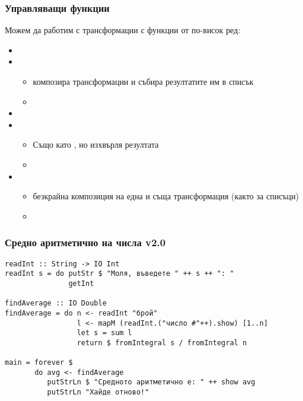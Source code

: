 \documentclass[alsotrans,beameroptions={aspectratio=169}]{beamerswitch}
\begin{document}
\begin{frame}
  \frametitle{Управляващи функции}

  Можем да работим с трансформации с функции от по-висок ред:
  \begin{itemize}[<+->]
  \item {}
  \item {}
    \begin{itemize}
    \item композира трансформации и събира резултатите им в списък
    \item {} %
    \end{itemize}
  \item {}
  \item {}
    \begin{itemize}
    \item Също като , но изхвърля резултата
    \item {}
    \end{itemize}
  \item {}
    \begin{itemize}
    \item безкрайна композиция на една и съща трансформация (както  за списъци)
    \item {}
    \end{itemize}
  \end{itemize}
\end{frame}

\begin{frame}[fragile]
  \frametitle{Средно аритметично на числа v2.0}

  \small
\begin{lstlisting}
readInt :: String -> IO Int
readInt s = do putStr $ "Моля, въведете " ++ s ++ ": "
               getInt

findAverage :: IO Double
findAverage = do n <- readInt "брой"
                 l <- mapM (readInt.("число #"++).show) [1..n]
                 let s = sum l
                 return $ fromIntegral s / fromIntegral n

main = forever $
       do avg <- findAverage
          putStrLn $ "Средното аритметично е: " ++ show avg
          putStrLn "Хайде отново!"
\end{lstlisting}
\end{frame}
\end{document}

